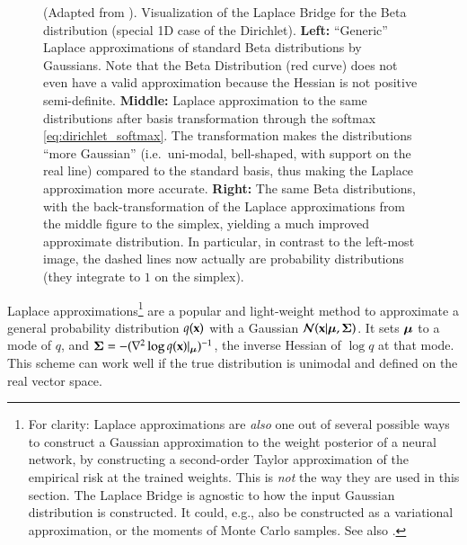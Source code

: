 
\setlength{\figwidth}{0.5\textwidth}
\setlength{\figheight}{0.25\textheight}

\begin{figure}[htb]
	\centering
	\resizebox{\textwidth}{!}{%
		
	}
	\caption{(Adapted from \citet{KernelTopicModels2012}). Visualization of the Laplace Bridge for the Beta distribution (special 1D case of the Dirichlet). \textbf{Left:} ``Generic'' Laplace approximations of standard Beta distributions by Gaussians. Note that the Beta Distribution (red curve) does not even have a valid approximation because the Hessian is not positive semi-definite. \textbf{Middle:} Laplace approximation to the same distributions after basis transformation through the softmax \eqref{eq:dirichlet_softmax}. The transformation makes the distributions ``more Gaussian'' (i.e.~uni-modal, bell-shaped, with support on the real line) compared to the standard basis, thus making the Laplace approximation more accurate. \textbf{Right:} The same Beta distributions, with the back-transformation of the Laplace approximations from the middle figure to the simplex, yielding a much improved approximate distribution. In particular, in contrast to the left-most image, the dashed lines now actually are probability distributions (they integrate to $1$ on the simplex).}
	\label{fig:1D_Laplace_bridge}
	\vspace{-0.75em}
\end{figure}


Laplace approximations\footnote{For clarity: Laplace approximations are \emph{also} one out of several possible ways to construct a Gaussian approximation to the weight posterior of a neural network, by constructing a second-order Taylor approximation of the empirical risk at the trained weights. This is \emph{not} the way they are used in this section. The Laplace Bridge is agnostic to how the input Gaussian distribution is constructed. It could, e.g., also be constructed as a variational approximation, or the moments of Monte Carlo samples. See also .} are a popular and light-weight method to approximate a general probability distribution $q(\mathbf{x})$ with a Gaussian $\mathcal{N}(\mathbf{x} | {\boldsymbol{\mu}}, {\boldsymbol{\Sigma}})$. It sets ${\boldsymbol{\mu}}$ to a mode of $q$, and ${\boldsymbol{\Sigma}}=-(\nabla^2 \log q(\mathbf{x}) \vert_{\boldsymbol{\mu}})^{-1}$, the inverse Hessian of $\log q$ at that mode. This scheme can work well if the true distribution is unimodal and defined on the real vector space.

